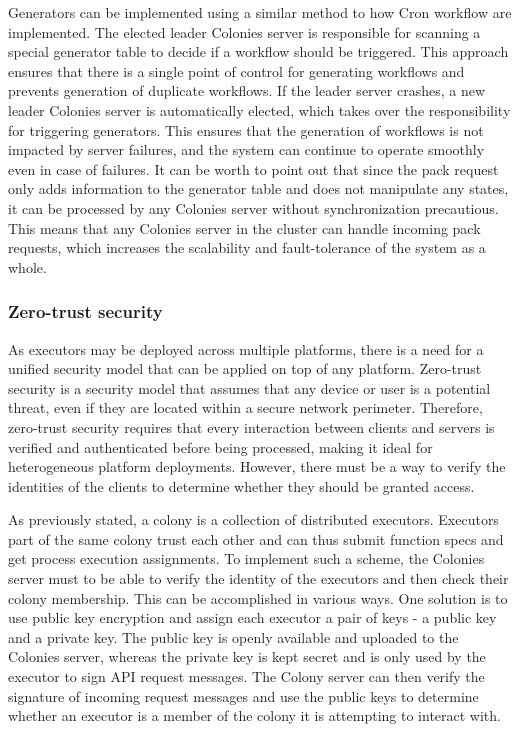 \documentclass{article}
\begin{document}
Generators can be implemented using a similar method to how Cron workflow are implemented. The elected leader Colonies server is responsible for scanning a special generator table to decide if a workflow should be triggered. This approach ensures that there is a single point of control for generating workflows and prevents generation of duplicate workflows. If the leader server crashes, a new leader Colonies server is automatically elected, which takes over the responsibility for triggering generators. This ensures that the generation of workflows is not impacted by server failures, and the system can continue to operate smoothly even in case of failures. It can be worth to point out that since the pack request only adds information to the generator table and does not manipulate any states, it can be processed by any Colonies server without synchronization precautious. This means that any Colonies server in the cluster can handle incoming pack requests, which increases the scalability and fault-tolerance of the system as a whole.

\subsubsection{Zero-trust security}
\label{zerotrustsecurity}
As executors may be deployed across multiple platforms, there is a need for a unified security model that can be applied on top of any platform. Zero-trust security \cite{zerotrust} is a security model that assumes that any device or user is a potential threat, even if they are located within a secure network perimeter. Therefore, zero-trust security requires that every interaction between clients and servers is verified and authenticated before being processed, making it ideal for heterogeneous platform deployments. However, there must be a way to verify the identities of the clients to determine whether they should be granted access.

As previously stated, a colony is a collection of distributed executors. Executors part of the same colony trust each other and can thus submit function specs and get process execution assignments. To implement such a scheme, the Colonies server must to be able to verify the identity of the executors and then check their colony membership. This can be accomplished in various ways. One solution is to use public key encryption and assign each executor a pair of keys - a public key and a private key. The public key is openly available and uploaded to the Colonies server, whereas the private key is kept secret and is only used by the executor to sign API request messages. The Colony server can then verify the signature of incoming request messages and use the public keys to determine whether an executor is a member of the colony it is attempting to interact with.
\end{document}
